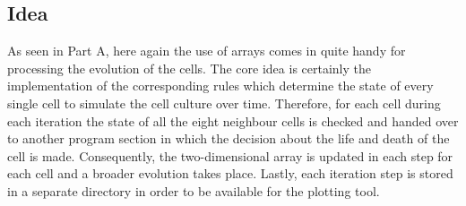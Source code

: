 \documentclass[12pt,a4paper]{article}
\begin{document}
\vspace{1cm}

\subsection{Idea}
As seen in Part A, here again the use of arrays comes in quite handy for processing the
evolution of the cells. The core idea is certainly the implementation of the corresponding
rules which determine the state of every single cell to simulate the cell culture over time.
Therefore, for each cell during each iteration the state of all the eight neighbour cells is
checked and handed over to another program section in which the decision about the life
and death of the cell is made. Consequently, the two-dimensional array is updated in each
step for each cell and a broader evolution takes place. Lastly, each iteration step is stored
in a separate directory in order to be available for the plotting tool.


\newpage
\end{document}
